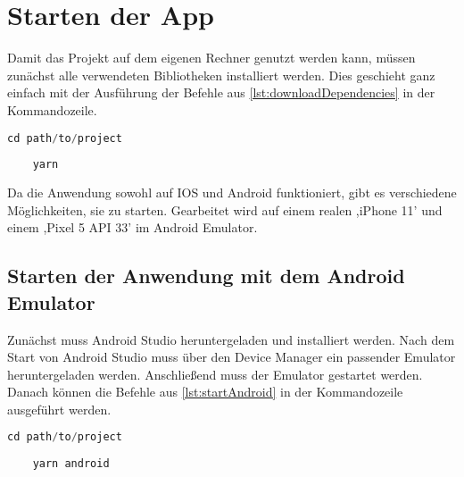 \chapter{Starten der App}
Damit das Projekt auf dem eigenen Rechner genutzt werden kann, müssen zunächst alle verwendeten Bibliotheken installiert werden. Dies geschieht ganz einfach mit der Ausführung der Befehle aus \autoref{lst:downloadDependencies} in der Kommandozeile.

\begin{lstlisting}[caption={Diese Befehle müssen in die Kommandozeile eingegeben und anschließend ausgeführt werden, damit das Projekt verwendet werden kann. So werden die notwendigen Bibliotheken installiert.},captionpos=b, language=Java, label=lst:downloadDependencies]
	cd path/to/project
	
	yarn
\end{lstlisting}


Da die Anwendung sowohl auf IOS und Android funktioniert, gibt es verschiedene Möglichkeiten, sie zu starten. Gearbeitet wird auf einem realen ,iPhone 11' und einem ,Pixel 5 API 33' im Android Emulator. 

\section{Starten der Anwendung mit dem Android Emulator} 
Zunächst muss Android Studio heruntergeladen und installiert werden. Nach dem Start von Android Studio muss über den Device Manager ein passender Emulator heruntergeladen werden. Anschließend muss der Emulator gestartet werden. Danach können die Befehle aus \autoref{lst:startAndroid} in der Kommandozeile ausgeführt werden.
\begin{lstlisting}[caption={Um die Anwendung mit mit Android zu starten, sollte Android Studio heruntergeladen und installiert sein. Anschließend muss der passende Emulator über den Device Manager hinzugefügt und gestartet werden. Danach werden diese Befehle in die Kommandozeile eingegeben und ausgeführt.},captionpos=b, language=Java, label=lst:startAndroid]
	cd path/to/project
	
	yarn android
\end{lstlisting}
	
